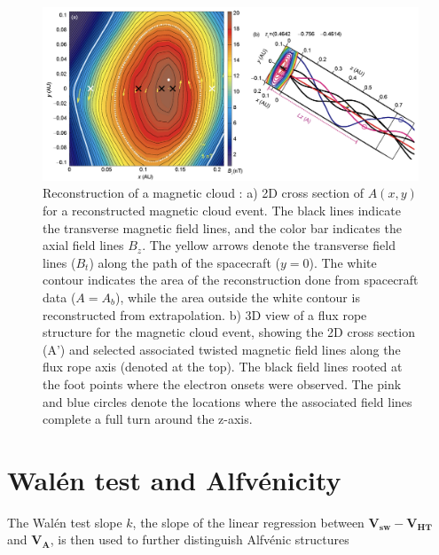 \begin{figure}[h!]
    \centering
    \includegraphics[width=\textwidth]{Figures/Reconstructions/Hu2015_GSreconstruction.png}
    \caption[GS 2D reconstruction of a magnetic cloud]{Reconstruction of a magnetic cloud \cite{Hu:2015}: a) 2D cross section of $A(x,y)$ for a reconstructed magnetic cloud event. The black lines indicate the transverse magnetic field lines, and the color bar indicates the axial field lines $B_z$. The yellow arrows denote the transverse field lines ($B_t$) along the path of the spacecraft ($y=0$). The white contour indicates the area of the reconstruction done from spacecraft data ($A=A_b$), while the area outside the white contour is reconstructed from extrapolation. b) 3D view of a flux rope structure for the magnetic cloud event, showing the 2D cross section (A') and selected associated twisted magnetic field lines along the flux rope axis (denoted at the top). The black field lines  rooted at the foot points where the electron onsets were observed. The pink and blue circles denote the locations where the associated field lines complete a full turn around the z-axis.}
    \label{fig:GSreconstruction_Hu2015}
\end{figure}


\section{Wal\'en test and Alfv\'enicity}
The Wal\'en test slope $k$, the slope of the linear regression between $\mathbf{V_{sw}} - \mathbf{V_{HT}}$ and $\mathbf{V_A}$, is then used to further distinguish Alfv\'enic structures

